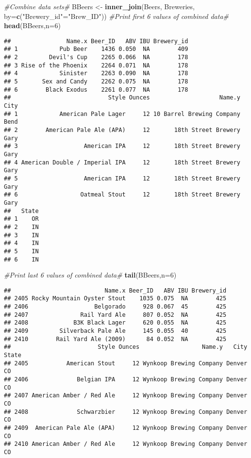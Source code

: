 \documentclass[]{article}
\newenvironment{Shaded}{\begin{snugshade}}{\end{snugshade}}
\newcommand{\CommentTok}[1]{\textcolor[rgb]{0.56,0.35,0.01}{\textit{#1}}}
\newcommand{\DataTypeTok}[1]{\textcolor[rgb]{0.13,0.29,0.53}{#1}}
\newcommand{\DecValTok}[1]{\textcolor[rgb]{0.00,0.00,0.81}{#1}}
\newcommand{\KeywordTok}[1]{\textcolor[rgb]{0.13,0.29,0.53}{\textbf{#1}}}
\newcommand{\NormalTok}[1]{#1}
\newcommand{\StringTok}[1]{\textcolor[rgb]{0.31,0.60,0.02}{#1}}
\begin{document}
\begin{Shaded}
\begin{Highlighting}[]
\CommentTok{#Combine data sets#}
\NormalTok{BBeers <-}\StringTok{ }\KeywordTok{inner_join}\NormalTok{(Beers, Breweries, }\DataTypeTok{by=}\KeywordTok{c}\NormalTok{(}\StringTok{"Brewery_id"}\NormalTok{=}\StringTok{"Brew_ID"}\NormalTok{))}
\CommentTok{#Print first 6 values of combined data#}
\KeywordTok{head}\NormalTok{(BBeers,}\DataTypeTok{n=}\DecValTok{6}\NormalTok{)}
\end{Highlighting}
\end{Shaded}

\begin{verbatim}
##                Name.x Beer_ID   ABV IBU Brewery_id
## 1            Pub Beer    1436 0.050  NA        409
## 2         Devil's Cup    2265 0.066  NA        178
## 3 Rise of the Phoenix    2264 0.071  NA        178
## 4            Sinister    2263 0.090  NA        178
## 5       Sex and Candy    2262 0.075  NA        178
## 6        Black Exodus    2261 0.077  NA        178
##                            Style Ounces                    Name.y City
## 1            American Pale Lager     12 10 Barrel Brewing Company Bend
## 2        American Pale Ale (APA)     12       18th Street Brewery Gary
## 3                   American IPA     12       18th Street Brewery Gary
## 4 American Double / Imperial IPA     12       18th Street Brewery Gary
## 5                   American IPA     12       18th Street Brewery Gary
## 6                  Oatmeal Stout     12       18th Street Brewery Gary
##   State
## 1    OR
## 2    IN
## 3    IN
## 4    IN
## 5    IN
## 6    IN
\end{verbatim}

\begin{Shaded}
\begin{Highlighting}[]
\CommentTok{#Print last 6 values of combined data#}
\KeywordTok{tail}\NormalTok{(BBeers,}\DataTypeTok{n=}\DecValTok{6}\NormalTok{)}
\end{Highlighting}
\end{Shaded}

\begin{verbatim}
##                           Name.x Beer_ID   ABV IBU Brewery_id
## 2405 Rocky Mountain Oyster Stout    1035 0.075  NA        425
## 2406                   Belgorado     928 0.067  45        425
## 2407               Rail Yard Ale     807 0.052  NA        425
## 2408             B3K Black Lager     620 0.055  NA        425
## 2409         Silverback Pale Ale     145 0.055  40        425
## 2410        Rail Yard Ale (2009)      84 0.052  NA        425
##                         Style Ounces                  Name.y   City State
## 2405           American Stout     12 Wynkoop Brewing Company Denver    CO
## 2406              Belgian IPA     12 Wynkoop Brewing Company Denver    CO
## 2407 American Amber / Red Ale     12 Wynkoop Brewing Company Denver    CO
## 2408              Schwarzbier     12 Wynkoop Brewing Company Denver    CO
## 2409  American Pale Ale (APA)     12 Wynkoop Brewing Company Denver    CO
## 2410 American Amber / Red Ale     12 Wynkoop Brewing Company Denver    CO
\end{verbatim}
\end{document}
